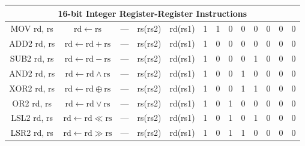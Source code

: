 \documentclass[a4paper,10pt]{article}
\begin{document}
\begin{landscape}
\begin{longtable}[c]{|c|c|@{}c@{}|@{}c@{}|@{}c@{}|@{}c@{}|@{}c@{}|@{}c@{}|@{}c@{}|@{}c@{}|@{}c@{}|@{}c@{}|@{}c@{}|@{}c@{}|@{}c@{}|@{}c@{}|@{}c@{}|@{}c@{}|@{}c@{}|@{}c@{}|@{}c@{}|@{}c@{}|@{}c@{}|@{}c@{}|@{}c@{}|@{}c@{}|}
\hline
\multicolumn{26}{|c|}{16-bit Integer Register-Register Instructions}                                                                                                                                                                                                                                                             \\\hline
MOV rd, rs            & $\mathrm{rd} \leftarrow \mathrm{rs}$ & \multicolumn{8}{c|}{---}                                   & \multicolumn{4}{c|}{rs(rs2)}        & \multicolumn{4}{c|}{rd(rs1)} & 1                & 1                & 0   & 0   & 0   & 0 & 0 & 0 \\
ADD2 rd, rs           & $\mathrm{rd} \leftarrow \mathrm{rd} + \mathrm{rs}$ & \multicolumn{8}{c|}{---}                                   & \multicolumn{4}{c|}{rs(rs2)}        & \multicolumn{4}{c|}{rd(rs1)} & 1                & 0                & 0   & 0   & 0   & 0 & 0 & 0 \\
SUB2 rd, rs           & $\mathrm{rd} \leftarrow \mathrm{rd} - \mathrm{rs}$ & \multicolumn{8}{c|}{---}                                   & \multicolumn{4}{c|}{rs(rs2)}        & \multicolumn{4}{c|}{rd(rs1)} & 1                & 0                & 0   & 0   & 1   & 0 & 0 & 0 \\
AND2 rd, rs           & $\mathrm{rd} \leftarrow \mathrm{rd} \land \mathrm{rs}$ & \multicolumn{8}{c|}{---}                                   & \multicolumn{4}{c|}{rs(rs2)}        & \multicolumn{4}{c|}{rd(rs1)} & 1                & 0                & 0   & 1   & 0   & 0 & 0 & 0 \\
XOR2 rd, rs           & $\mathrm{rd} \leftarrow \mathrm{rd} \oplus \mathrm{rs}$ & \multicolumn{8}{c|}{---}                                   & \multicolumn{4}{c|}{rs(rs2)}        & \multicolumn{4}{c|}{rd(rs1)} & 1                & 0                & 0   & 1   & 1   & 0 & 0 & 0 \\
OR2 rd, rs            & $\mathrm{rd} \leftarrow \mathrm{rd} \lor \mathrm{rs}$ & \multicolumn{8}{c|}{---}                                   & \multicolumn{4}{c|}{rs(rs2)}        & \multicolumn{4}{c|}{rd(rs1)} & 1                & 0                & 1   & 0   & 0   & 0 & 0 & 0 \\
LSL2 rd, rs           & $\mathrm{rd} \leftarrow \mathrm{rd} \ll \mathrm{rs}$ & \multicolumn{8}{c|}{---}                                   & \multicolumn{4}{c|}{rs(rs2)}        & \multicolumn{4}{c|}{rd(rs1)} & 1                & 0                & 1   & 0   & 1   & 0 & 0 & 0 \\
LSR2 rd, rs           & $\mathrm{rd} \leftarrow \mathrm{rd} \gg \mathrm{rs}$ & \multicolumn{8}{c|}{---}                                   & \multicolumn{4}{c|}{rs(rs2)}        & \multicolumn{4}{c|}{rd(rs1)} & 1                & 0                & 1   & 1   & 0   & 0 & 0 & 0 \\

\end{longtable}
\end{landscape}
\end{document}
